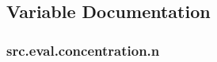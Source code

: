 \subsection{Variable Documentation}
\subsubsection[{\texorpdfstring{n}{n}}]{\setlength{\rightskip}{0pt plus 5cm}src.\+eval.\+concentration.\+n}\hypertarget{namespacesrc_1_1eval_1_1concentration_a31fc2d0b98a6e58bf5930064d0ce250c}{}\label{namespacesrc_1_1eval_1_1concentration_a31fc2d0b98a6e58bf5930064d0ce250c}
